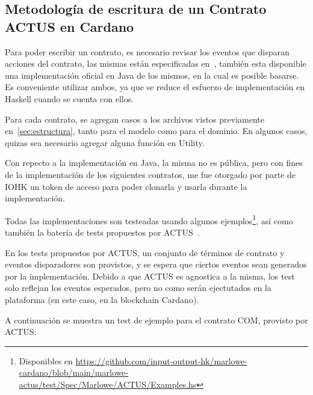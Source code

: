 \documentclass[12pt]{book}
\begin{document}
\subsection{Metodología de escritura de un Contrato ACTUS en Cardano}

Para poder escribir un contrato, es necesario revisar los eventos que disparan acciones del contrato, las mismas están especificadas en~\cite{ACTUS_Techspecs}, también esta disponible una implementación oficial en Java de los mismos, en la cual es posible basarse. Es conveniente utilizar ambos, ya que se reduce el esfuerzo de implementación en Haskell cuando se cuenta con ellos.

Para cada contrato, se agregan casos a los archivos vistos previamente en~\ref{sec:estructura}, tanto para el modelo como para el dominio. En algunos casos, quizas sea necesario agregar alguna función en Utility.

Con repecto a la implementación en Java, la misma no es pública, pero con fines de la implementación de los siguientes contratos, me fue otorgado por parte de IOHK un token de acceso para poder clonarla y usarla durante la implementación.

Todas las implementaciones son testeadas usando algunos ejemplos\footnote{Disponibles en \href{https://github.com/input-output-hk/marlowe-cardano/blob/main/marlowe-actus/test/Spec/Marlowe/ACTUS/Examples.hs}{https://github.com/input-output-hk/marlowe-cardano/blob/main/marlowe-actus/test/Spec/Marlowe/ACTUS/Examples.hs}}, así como también la batería de tests propuestos por ACTUS~\cite{ACTUS_Tests}.

En los tests propuestos por ACTUS, un conjunto de términos de contrato y eventos disparadores son provistos, y se espera que ciertos eventos sean generados por la implementación. Debido a que ACTUS es agnostica a la misma, los test solo reflejan los eventos esperados, pero no como serán ejectutados en la plataforma (en este caso, en la blockchain Cardano).

A continuación se muestra un test de ejemplo para el contrato COM, provisto por ACTUS:\@
\end{document}

